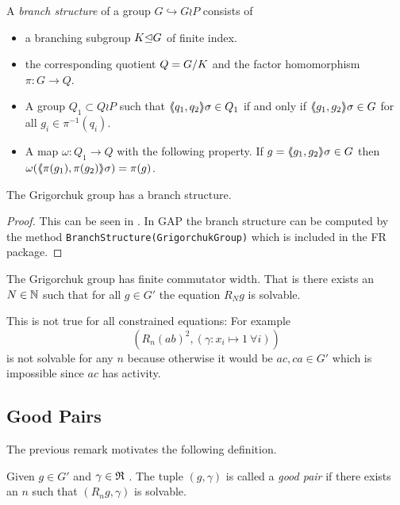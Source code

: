 \documentclass[a4paper,11pt]{amsart}
\begin{document}
\begin{defi} 
A \emph{branch structure} of a group $G\hookrightarrow G \wr P$ consists of  
\begin{itemize}
 \item a branching subgroup $K{\mathrel\trianglelefteq} G$ of finite index. 
 \item the corresponding quotient $Q={G/K}$ and the factor homomorphism $\pi\colon G \to Q$.
 \item A group $Q_1 \subset Q \wr P$ such that $\langle\negthickspace\langle q_1,q_2\rangle\negthickspace\rangle\sigma\in Q_1$ if and only if $\langle\negthickspace\langle g_1,g_2\rangle\negthickspace\rangle\sigma \in G$ for all $g_i \in \pi^{-1}(q_i)$.
 \item A map $\omega\colon Q_1 \to Q$ with the following property. If $g=\langle\negthickspace\langle g_1,g_2\rangle\negthickspace\rangle\sigma \in G$ then $\omega(\langle\negthickspace\langle\pi(g_1),\pi(g_2)\rangle\negthickspace\rangle\sigma) = \pi(g)$.
\end{itemize}
\end{defi}
\begin{lem}
 The Grigorchuk group has a branch structure.
\end{lem}
\begin{proof}
 This can be seen in \cite{Bartholdi:RepresentationZetaFunctions}. In GAP the branch structure can be computed
 by the method \lstinline{BranchStructure(GrigorchukGroup)} which is included in the FR package. 
\end{proof}


\begin{thm}\label{IgorsThm}
 The Grigorchuk group has finite commutator width. That is
 there exists an $N\in\mathbb{N}$ such that for all $g\in G'$ the equation $R_Ng$ is solvable.
\end{thm}
\begin{re}
 This is not true for all constrained equations: For example
 \[\left(R_n(ab)^2,(\gamma\colon x_i\mapsto 1\ \forall i)\right)\] 
 is not solvable for any $n$ because otherwise it would be $ac,ca\in G'$ 
 which is impossible since $ac$ has activity.
\end{re}

\subsection{Good Pairs}
The previous remark motivates the following definition.
\begin{defi}
Given $g\in G'$ and $\gamma\in\mathfrak{R}$ . The tuple $(g,\gamma)$ is called a \emph{good pair} if there exists an $n$ such that
$(R_ng,\gamma)$ is solvable.  
\end{defi}
\end{document}
